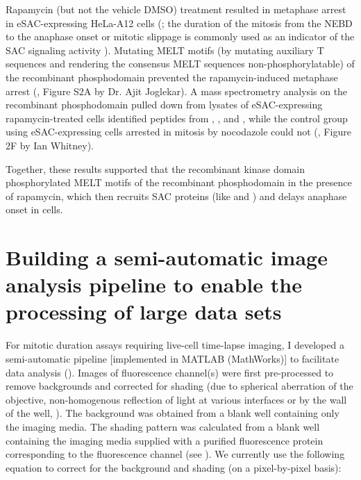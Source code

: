 Rapamycin (but not the vehicle DMSO) treatment resulted in metaphase arrest in eSAC-expressing HeLa-A12 cells (; the duration of the mitosis from the NEBD to the anaphase onset or mitotic slippage is commonly used as an indicator of the SAC signaling activity \cite{RiederNormalProgression, Rheostat, Ablation}). Mutating MELT motifs (by mutating auxiliary T\textOmega{} sequences \cite{RecombinantKNL1, MELTActivity} and rendering the consensus MELT sequences non-phosphorylatable) of the recombinant phosphodomain prevented the rapamycin-induced metaphase arrest (\cite{eSAC}, Figure S2A by Dr. Ajit Joglekar). A mass spectrometry analysis on the recombinant phosphodomain pulled down from lysates of eSAC-expressing rapamycin-treated cells identified peptides from , , and , while the control group using eSAC-expressing cells arrested in mitosis by nocodazole could not (\cite{eSAC}, Figure 2F by Ian Whitney).

Together, these results supported that the recombinant  kinase domain phosphorylated MELT motifs of the recombinant  phosphodomain in the presence of rapamycin, which then recruits SAC proteins (like  and ) and delays anaphase onset in cells.

\section{Building a semi-automatic image analysis pipeline to enable the processing of large data sets}
\label{IncuCyteAnalysis}

For mitotic duration assays requiring live-cell time-lapse imaging, I developed a semi-automatic pipeline [implemented in MATLAB (MathWorks)] to facilitate data analysis (). Images of fluorescence channel(s) were first pre-processed to remove backgrounds and corrected for shading (due to spherical aberration of the objective, non-homogenous reflection of light at various interfaces or by the wall of the well, ). The background was obtained from a blank well containing only the imaging media. The shading pattern was calculated from a blank well containing the imaging media supplied with a purified fluorescence protein corresponding to the fluorescence channel (see ). We currently use the following equation to correct for the background and shading (on a pixel-by-pixel basis):

